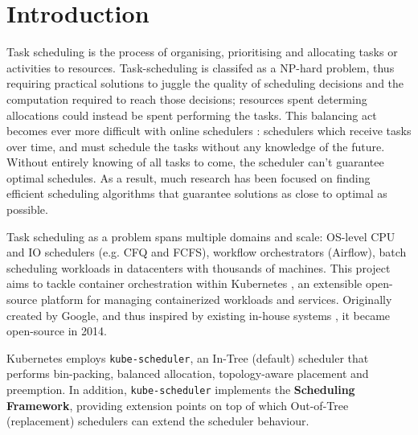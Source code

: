 \chapter{Introduction}
\label{firstcontentpage} %

%
%

Task scheduling is the process of organising, prioritising and allocating tasks
or activities to resources. Task-scheduling is classifed as a NP-hard
problem, thus requiring practical solutions to juggle the quality of scheduling
decisions and the computation required to reach those decisions; resources spent
determing allocations could instead be spent performing the tasks. This
balancing act becomes ever more difficult with online schedulers
\cite{pruhs2004online}: schedulers which receive tasks over time, and must
schedule the tasks without any knowledge of the future. Without entirely knowing
of all tasks to come, the scheduler can't guarantee optimal schedules. As a
result, much research has been focused on finding efficient scheduling
algorithms that guarantee solutions as close to optimal as possible.

Task scheduling as a problem spans multiple domains and scale: OS-level CPU and
IO schedulers (e.g. CFQ and FCFS), workflow orchestrators (Airflow), batch
scheduling workloads in datacenters with thousands of machines. This project
aims to tackle container orchestration within Kubernetes
\cite{kube-page}, an extensible open-source platform for managing
containerized workloads and services. Originally created by Google, and thus
inspired by existing in-house systems \cite{Borg}, it became open-source in
2014.

Kubernetes employs \verb|kube-scheduler|, an In-Tree (default) scheduler that
performs bin-packing, balanced allocation, topology-aware placement and
preemption. In addition, \verb|kube-scheduler| implements the \textbf{Scheduling
Framework}, providing extension points on top of which Out-of-Tree (replacement)
schedulers can extend the scheduler behaviour.


